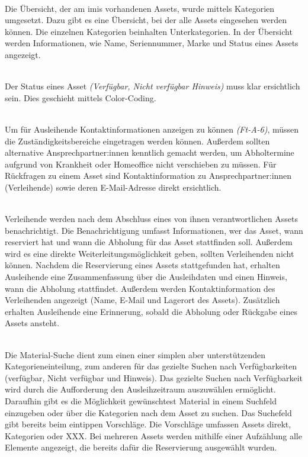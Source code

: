    {\sffamily\color{maincolor}{Ft-B-2 | Übersicht über ausleihbare Assets }}\\
Die Übersicht, der am \ac{imis} vorhandenen Assets, wurde mittels Kategorien umgesetzt. Dazu gibt es
eine Übersicht, bei der alle Assets eingesehen werden können. Die einzelnen Kategorien beinhalten
Unterkategorien. In der Übersicht werden Informationen, wie Name, Seriennummer, Marke und Status
eines Assets angezeigt.

    {\sffamily\color{maincolor}{Ft-B-3 |  Verfügbarkeit von Assets }}\\
Der Status eines Asset \textit{(Verfügbar, Nicht verfügbar Hinweis)} muss klar ersichtlich sein. Dies
geschieht mittels Color-Coding.  


{\sffamily\color{maincolor}{Ft-B-4 | Zuständigkeitsbereich }}\\
Um für Ausleihende Kontaktinformationen anzeigen zu können \textit{(Ft-A-6)}, müssen die
Zuständigkeitsbereiche eingetragen werden können. Außerdem sollten alternative Ansprechpartner:innen
kenntlich gemacht werden, um Abholtermine aufgrund von Krankheit oder Homeoffice nicht verschieben
zu müssen. Für Rückfragen zu einem Asset sind Kontaktinformation zu Ansprechpartner:innen
(Verleihende) sowie deren E-Mail-Adresse direkt ersichtlich.

{\sffamily\color{maincolor}{Ft-B-5 | Benachrichtigungen \& Erinnerungen }}\\
Verleihende werden nach dem Abschluss eines von ihnen verantwortlichen Assets benachrichtigt. Die
Benachrichtigung umfasst Informationen, wer das Asset, wann reserviert hat und wann die Abholung für
das Asset stattfinden soll. Außerdem wird es eine direkte Weiterleitungsmöglichkeit geben, sollten
Verleihenden nicht können. Nachdem die Reservierung eines Assets stattgefunden hat, erhalten
Ausleihende eine Zusammenfassung über die Ausleihdaten und einen Hinweis, wann die Abholung
stattfindet. Außerdem werden Kontaktinformation des Verleihenden angezeigt (Name, E-Mail und
Lagerort des Assets). Zusätzlich erhalten Ausleihende eine Erinnerung, sobald die Abholung oder
Rückgabe eines Assets ansteht.


    {\sffamily\color{maincolor}{Ft-B-6 | Material-Suche }}\\
Die Material-Suche dient zum einen einer simplen aber unterstützenden Kategorieneinteilung, zum
anderen für das gezielte Suchen nach Verfügbarkeiten (verfügbar, Nicht verfügbar und Hinweis). Das
gezielte Suchen nach Verfügbarkeit wird durch die Aufforderung den Ausleihzeitraum auszuwählen
ermöglicht. Daraufhin gibt es die Möglichkeit gewünschtest Material in einem Suchfeld einzugeben
oder über die Kategorien nach dem Asset zu suchen. Das Suchefeld gibt bereits beim eintippen
Vorschläge. Die Vorschläge umfassen Assets direkt, Kategorien oder XXX. Bei mehreren Assets werden
mithilfe einer Aufzählung alle Elemente angezeigt, die bereits dafür die Reservierung ausgewählt wurden.

